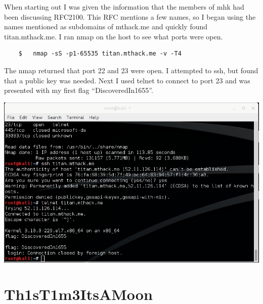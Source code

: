 \documentclass[12pt]{report}
\begin{document}
When starting out I was given the information that the members of mhk had been discussing RFC2100. This RFC mentions a few names, so I began using the names mentioned as subdomains of mthack.me and quickly found titan.mthack.me. I ran nmap on the host to see what ports were open.\\
	\begin{verbatim}
	$	nmap -sS -p1-65535 titan.mthack.me -v -T4
	\end{verbatim}
The nmap returned that port 22 and 23 were open. I attempted to ssh, but found that a public key was needed. Next I used telnet to connect to port 23 and was presented with my first flag ``DiscoveredIn1655''.\\
\newline
\begin{center}
\includegraphics[scale=0.33]{DiscoveredIn1655.png}
\end{center}
\section{Th1sT1m3ItsAMoon}
\end{document}
